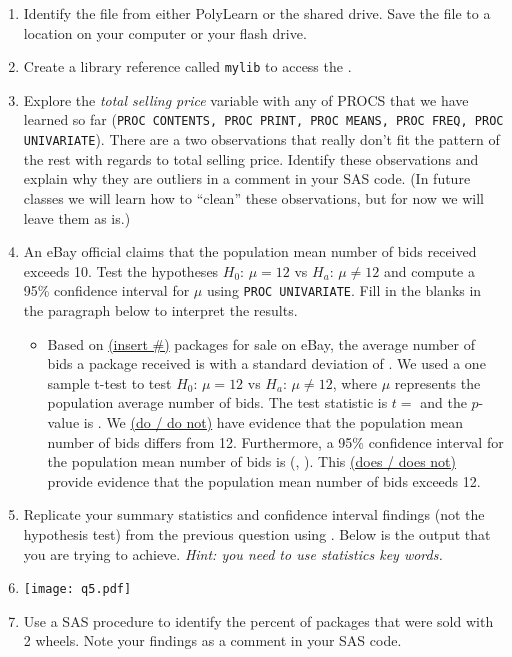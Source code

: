 \vskip10pt
\begin{enumerate}
\item Identify the  file from either PolyLearn or the shared drive.  Save the file to a location on your computer or your flash drive.
\item Create a library reference called \texttt{mylib} to access the .
\item Explore the \emph{total selling price} variable with any of PROCS that we have learned so far (\texttt{PROC CONTENTS, PROC PRINT, PROC MEANS, PROC FREQ, PROC UNIVARIATE}).  There are a two observations that really don't fit the pattern of the rest with regards to total selling price.  Identify these observations and explain why they are outliers in a comment in your SAS code.  (In future classes we will learn how to ``clean'' these observations, but for now we will leave them as is.)
\item An eBay official claims that the population mean number of bids received exceeds 10.  Test the hypotheses $H_0$: $\mu=12$ vs $H_a$: $\mu \neq 12$ and compute a 95\% confidence interval for $\mu$ using \texttt{PROC UNIVARIATE}.  Fill in the blanks in the paragraph below to interpret the results.
\begin{itemize}
\item[] \doublespacing
        Based on \underline{(insert \#)} packages for sale on eBay, the average number of bids a package received is \bs with a standard deviation of \bs.  We used a one sample t-test to test $H_0$: $\mu=12$ vs $H_a$: $\mu \neq 12$, where $\mu$ represents the population average number of bids.  The test statistic is $t=$ \bs and the $p$-value is \bs.  We \underline{(do / do not)} have evidence that the population mean number of bids differs from 12.  Furthermore, a 95\% confidence interval for the population mean number of bids is (\bs, \bs).  This \underline{(does / does not)} provide evidence that the population mean number of bids exceeds 12.
\end{itemize} 
\item Replicate your summary statistics and confidence interval findings (not the hypothesis test) from the previous question using .  Below is the output that you are trying to achieve.  \emph{Hint: you need to use statistics key words.}
\item[] 
\texttt{[image: q5.pdf]}
\emp
\item Use a SAS procedure to identify the percent of packages that were sold with 2 wheels.  Note your findings as a comment in your SAS code.

\end{enumerate}
